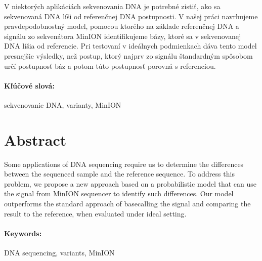 \documentclass[12pt, oneside]{book}
\theoremstyle{definition}
\theoremstyle{remark}
\begin{document}
V niektorých aplikáciách sekvenovania DNA je potrebné zistiť, ako sa sekvenovaná DNA
líši od referenčnej DNA postupnosti.  V našej práci navrhujeme pravdepodobnostný model,
pomocou ktorého na základe referenčnej DNA a signálu zo sekvenátora MinION
identifikujeme bázy, ktoré sa v sekvenovanej DNA líšia od referencie.
Pri testovaní v ideálnych podmienkach dáva tento model presnejšie výsledky, než postup, ktorý 
najprv zo signálu štandardným spôsobom určí postupnosť báz a potom túto postupnosť porovná s referenciou.


\paragraph*{Kľúčové slová:} 
sekvenovanie DNA, varianty, MinION


\newpage 
\section*{Abstract}

Some applications of DNA sequencing require us to determine the differences between the sequenced sample and the reference sequence. To address this problem, we propose a new approach based on a probabilistic model that can use the signal from MinION sequencer to identify such differences. Our model outperforms the standard approach of basecalling the signal and comparing the result to the reference, when evaluated under ideal setting.


\paragraph*{Keywords:} 
DNA sequencing, variants, MinION

%
%


\end{document}
